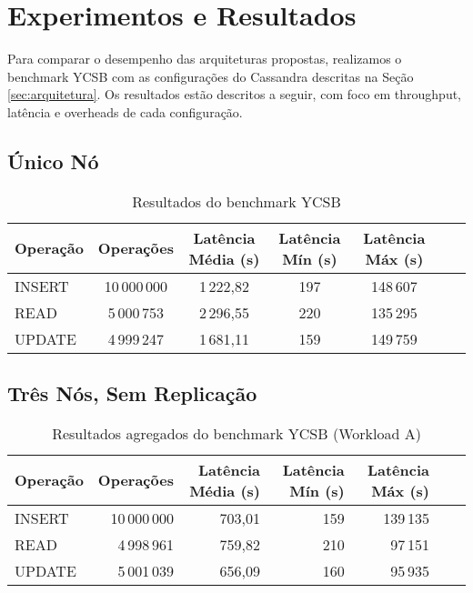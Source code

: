 \section{Experimentos e Resultados}

Para comparar o desempenho das arquiteturas propostas, realizamos o benchmark YCSB com as configurações do Cassandra descritas na Seção \ref{sec:arquitetura}.
Os resultados estão descritos a seguir, com foco em throughput, latência e overheads de cada configuração.

\subsection{Único Nó}


	\begin{table}[H]
	\centering
	\caption{Resultados do benchmark YCSB}
	\begin{tabular}{lcccccc}
	\hline
	Operação & Operações & Latência Média (\textmu s) & Latência Mín (\textmu s) & Latência Máx (\textmu s) \\
	\hline
	INSERT   & 10\,000\,000 & 1\,222,82 & 197   & 148\,607 \\
	READ     & 5\,000\,753  & 2\,296,55 & 220   & 135\,295 \\
	UPDATE   & 4\,999\,247  & 1\,681,11 & 159   & 149\,759 \\
	\hline
	\end{tabular}
	\end{table}

\subsection{Três Nós, Sem Replicação}


	\begin{table}[H]
	\centering
	\caption{Resultados agregados do benchmark YCSB (Workload A)}
	\begin{tabular}{lrrrrrr}
	\hline
	Operação & Operações & Latência Média (\textmu s) & Latência Mín (\textmu s) & Latência Máx (\textmu s) \\
	\hline
	INSERT   & 10\,000\,000 & 703,01 & 159 & 139\,135 \\
	READ     & 4\,998\,961  & 759,82 & 210 & 97\,151  \\
	UPDATE   & 5\,001\,039  & 656,09 & 160 & 95\,935  \\
	\hline
	\end{tabular}
	\end{table}

